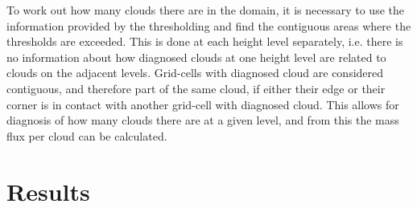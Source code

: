 \documentclass[11pt,a4paper]{article}
\newcommand*\mean[1]{\overline{#1}}
\newcommand\todo[1]{\textbf{TODO: #1}}
\begin{document}
To work out how many clouds there are in the domain, it is necessary to use the information provided by the thresholding and find the contiguous areas where the thresholds are exceeded. This is done at each height level separately, i.e. there is no information about how diagnosed clouds at one height level are related to clouds on the adjacent levels. Grid-cells with diagnosed cloud are considered contiguous, and therefore part of the same cloud, if either their edge or their corner is in contact with another grid-cell with diagnosed cloud. This allows for diagnosis of how many clouds there are at a given level, and from this the mass flux per cloud can be calculated.

\newpage
\section{Results}

%
\end{document}
